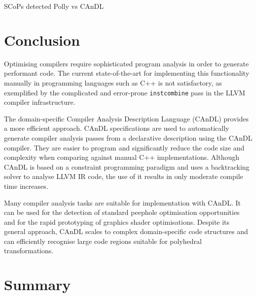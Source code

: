 \begin{table}[ht]
    
    \caption{SCoPs detected Polly vs CAnDL}
    \label{fig:candlvspolly}
\end{table}

\pagebreak

\section{Conclusion}

    Optimising compilers require sophisticated program analysis in order to
    generate performant code.
    The current state-of-the-art for implementing this functionality manually in
    programming languages such as C++ is not satisfactory, as exemplified by the
    complicated and error-prone {\tt instcombine} pass in the LLVM compiler
    infrastructure.

    The domain-specific Compiler Analysis Description Language (CAnDL) provides
    a more efficient approach.
    CAnDL specifications are used to automatically generate compiler analysis
    passes from a declarative description using the CAnDL compiler.
    They are easier to program and significantly reduce the code size and
    complexity when comparing against manual C++ implementations.
    Although CAnDL is based on a constraint programming paradigm and uses a
    backtracking solver to analyse LLVM IR code, the use of it results in
    only moderate compile time increases.

    Many compiler analysis tasks are suitable for implementation with CAnDL.
    It can be used for the detection of standard peephole optimisation
    opportunities and for the rapid prototyping of graphics shader
    optimisations.
    Despite its general approach, CAnDL scales to complex domain-specific code
    structures and can efficiently recognise large code regions suitable for
    polyhedral transformations.

\section{Summary}

    